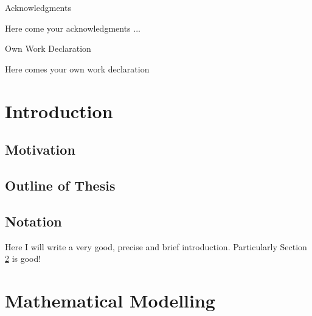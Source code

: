 \documentclass[11pt,twoside]{article}
\numberwithin{Theorem}{section}
\numberwithin{Definition}{section}
\numberwithin{Lemma}{section}
\numberwithin{Algorithm}{section}
\numberwithin{equation}{section}
\begin{document}
\clearpage

\begin{center}
\Large{Acknowledgments}
\end{center}

Here come your acknowledgments ...

\clearpage

\begin{center}
\Large{Own Work Declaration}
\end{center}

Here comes your own work declaration

\cleardoublepage



\pagestyle{plain}
\setcounter{page}{1}

\tableofcontents
\clearpage
\listoftables
\listoffigures
\cleardoublepage

\setcounter{page}{1}

\nocite{*}

\clearpage

\section{Introduction}
\label{sec.intro}

\subsection{Motivation}

\subsection{Outline of Thesis}

\subsection{Notation}

Here I will write a very good, precise and brief introduction.
Particularly Section \ref{sec:background} is good!
\clearpage

\section{Mathematical Modelling}
\label{sec:background}
\end{document}
